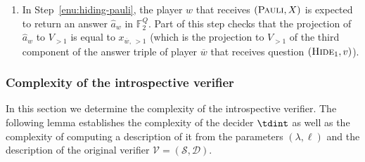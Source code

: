 \documentclass[11pt]{article}
\theoremstyle{definition}
\newcommand{\F}{\ensuremath{\mathbb{F}}}
\newcommand{\sampler}{\mathcal{S}}
\newcommand{\decider}{\mathcal{D}}
\newcommand{\verifier}{\mathcal{V}}
\newcommand{\gamestyle}[1]{\ensuremath{\textsc{#1}}\xspace}
\newcommand{\trole}{\ensuremath{v}}
\newcommand{\typestyle}[1]{\ensuremath{\textsc{#1}}\xspace}
\newcommand{\Pauli}{\typestyle{Pauli}}
\newcommand{\Hide}[1]{\typestyle{Hide}_{#1}}
\begin{document}
\begin{enumerate}
  The decider also has to compute $( \Lfunc )^\perp (x_{w,\, k+1})$.
  According to Definition~\ref{def:Lperp}, this requires specifying a basis for
  $\ker( \Lfunc )^\perp$.
  To compute the value, the decider performs the following steps:
	\begin{enumerate}
  \item Call $\sampler$ on input $(N, \trole, \gamestyle{factor}, k+1, y_{\overline{w},\, \le k})$ to
    obtain a subset $H = \{h_1,\ldots,h_m\}$ of the canonical basis for
    $\F_2^{s(N)}$ that is a basis of the register subspace $V^\trole_{k+1}(y_{\overline{w}})$.
  \item For $i \in \{1, 2, \ldots, m\}$ compute $c_i = \sampler(N, \trole,
    \gamestyle{linear}, k+1, y_{\overline{w},\, \le k}, h_i)$.
    Compute a matrix representation $M$ for $ \Lfunc $ in the basis
    $H$, whose columns are the vectors $c_1, \ldots, c_m$ as elements of
    $V^\trole_{k+1}(y_{\overline{w}})$.

  \item Using a canonical algorithm for Gaussian elimination, compute a basis
    $F$ for $\ker(M)$.

  \item Compute the canonical complement $S$ of $F$, as in
    Definition~\ref{def:canonical-complement}.
    $S$ is a basis for $\ker( \Lfunc )^\perp$.

  \item To compute $(\Lfunc)^\perp$ on input
    $x_{w,\, k+1}$, compute the canonical linear map with kernel basis
    $S$ (see Definition~\ref{def:cl-canonical}) on input $x_{w,\,
      k+1}$.
  \end{enumerate}

\item In Step~\ref{enu:hiding-pauli}, the player $w$ that receives $(\Pauli,X)$
  is expected to return an answer $\hat{a}_w$ in $\F_2^Q$.
  Part of this step checks that the projection of $\hat{a}_w$ to $V_{>1}$ is
  equal to $x_{\overline{w},\, >1}$ (which is the projection to $V_{>1}$ of the
  third component of the answer triple of player $\overline{w}$ that receives
  question $(\Hide{1},\trole)$).
\end{enumerate}

\subsubsection{Complexity of the introspective verifier}
\label{sec:intro-complexity}

In this section we determine the complexity of the introspective verifier.
The following lemma establishes the complexity of the decider $\tdint$
as well as the complexity of computing a {description} of it from the parameters
$(\lambda,\ell)$ and the description of the original verifier $\verifier =
(\sampler,\decider)$.
\end{document}
